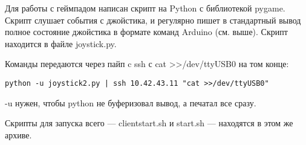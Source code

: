 \documentclass[a4paper]{article}
\begin{document}
Для работы с геймпадом написан скрипт на Python с библиотекой pygame. Скрипт слушает события с джойстика, и регулярно пишет в стандартный вывод полное состояние джойстика в формате команд Arduino (см. выше).
Скрипт находится в файле joystick.py.

Команды передаются через пайп c ssh с cat >>/dev/ttyUSB0 на том конце:
\begin{verbatim}
python -u joystick2.py | ssh 10.42.43.11 "cat >>/dev/ttyUSB0" 
\end{verbatim}
-u нужен, чтобы python не буферизовал вывод, а печатал все сразу.

Скрипты для запуска всего --- clientstart.sh и start.sh --- находятся в этом же архиве.
\end{document}
